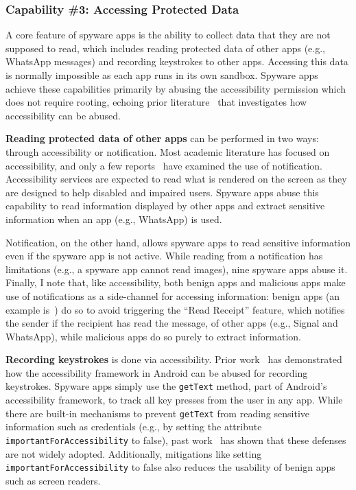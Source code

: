 \subsubsection*{Capability \#3: Accessing Protected Data}
A core feature of spyware apps is the ability to collect data that they
are not supposed to read, which includes reading protected data of other apps (e.g.,
WhatsApp messages) and recording keystrokes to other apps. Accessing this data is normally
impossible as each app runs in its own sandbox. Spyware apps achieve these
capabilities primarily by abusing the accessibility permission which does not
require rooting, echoing prior literature~\cite{fratantonio2017cloak,
kraunelis2013malware, jang2014a11y, diao2019kindness, kalysch2018android,
huang2021a11y, naseri2019accessileaks} that investigates how accessibility can
be abused.

\textbf{Reading protected data of other apps} can be performed in two ways: through
accessibility or notification. Most academic literature has focused on
accessibility, and only a few reports~\cite{VB2019Za6:online} have examined the
use of notification. Accessibility services are expected to read what is
rendered on the screen as they are designed to help disabled and impaired users.
Spyware apps abuse this capability to read information displayed by other apps
and extract sensitive information when an app (e.g., WhatsApp) is used.

Notification, on the other hand, allows spyware apps to read sensitive
information even if the spyware app is not active. While reading from a notification has
limitations (e.g., a spyware app cannot read images), nine spyware apps abuse it.
Finally, I note that, like accessibility, both benign apps and malicious apps
make use of notifications as a side-channel for accessing information: benign
apps (an example is~\cite{ReadUnre55:online}) do so to avoid triggering the ``Read Receipt'' feature, which notifies the
sender if the recipient has read the message,
of other apps (e.g., Signal and WhatsApp), while malicious apps do so
purely to extract information.

\textbf{Recording keystrokes} is done via accessibility. Prior
work~\cite{fratantonio2017cloak,jang2014a11y,naseri2019accessileaks} has
demonstrated how the accessibility framework in Android can be abused for
recording keystrokes.
Spyware apps simply use the \texttt{getText} method, part
of Android's accessibility framework, to track all key presses from the user in
any app.
While there are built-in mechanisms to prevent \texttt{getText} from
reading sensitive information such as credentials (e.g., by setting
the attribute
\texttt{importantForAccessibility} to false), past
work~\cite{naseri2019accessileaks} has shown that these defenses are not
widely adopted. Additionally, mitigations like setting \texttt{importantForAccessibility} to
false also reduces the usability of benign apps such as screen readers.

